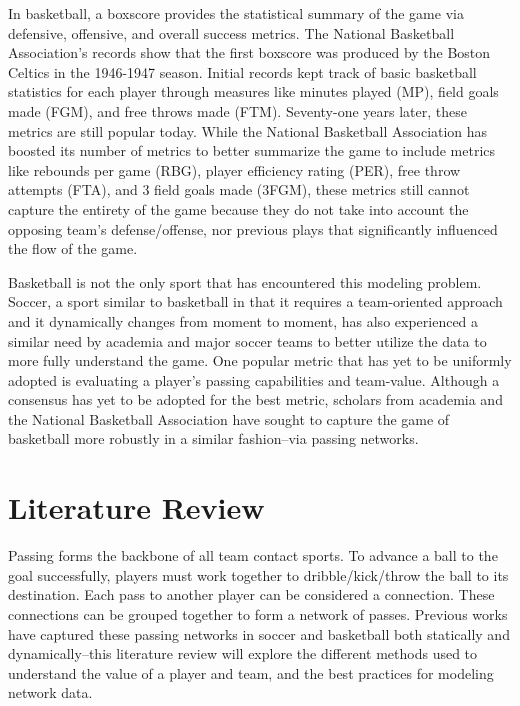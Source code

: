 \documentclass[12pt,twoside]{dukestatscithesis}
\theoremstyle{definition}
\theoremstyle{definition}
\theoremstyle{definition}
\theoremstyle{remark}
\begin{document}
In basketball, a boxscore provides the statistical summary of the game
via defensive, offensive, and overall success metrics. The National
Basketball Association's records show that the first boxscore was
produced by the Boston Celtics in the 1946-1947 season. Initial records
kept track of basic basketball statistics for each player through
measures like minutes played (MP), field goals made (FGM), and free
throws made (FTM). Seventy-one years later, these metrics are still
popular today. While the National Basketball Association has boosted its
number of metrics to better summarize the game to include metrics like
rebounds per game (RBG), player efficiency rating (PER), free throw
attempts (FTA), and 3 field goals made (3FGM), these metrics still
cannot capture the entirety of the game because they do not take into
account the opposing team's defense/offense, nor previous plays that
significantly influenced the flow of the game.

Basketball is not the only sport that has encountered this modeling
problem. Soccer, a sport similar to basketball in that it requires a
team-oriented approach and it dynamically changes from moment to moment,
has also experienced a similar need by academia and major soccer teams
to better utilize the data to more fully understand the game. One
popular metric that has yet to be uniformly adopted is evaluating a
player's passing capabilities and team-value. Although a consensus has
yet to be adopted for the best metric, scholars from academia and the
National Basketball Association have sought to capture the game of
basketball more robustly in a similar fashion--via passing networks.

\chapter{Literature Review}\label{rmd-basics}

Passing forms the backbone of all team contact sports. To advance a ball
to the goal successfully, players must work together to
dribble/kick/throw the ball to its destination. Each pass to another
player can be considered a connection. These connections can be grouped
together to form a network of passes. Previous works have captured these
passing networks in soccer and basketball both statically and
dynamically--this literature review will explore the different methods
used to understand the value of a player and team, and the best
practices for modeling network data.
\end{document}

